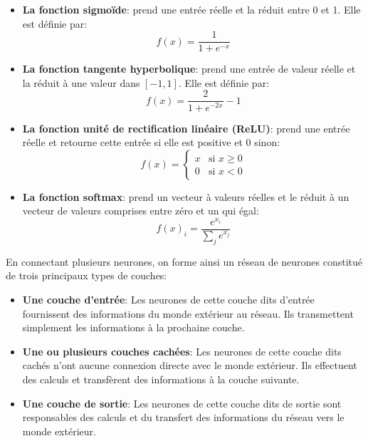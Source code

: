     \begin{itemize}
        \item \textbf{La fonction sigmoïde}: prend une entrée réelle et la réduit entre 0 et 1. Elle est définie par:
            \begin{equation}
                f(x) = \frac{1}{1 + e^{-x}}
            \end{equation}
        \item \textbf{La fonction tangente hyperbolique}: prend une entrée de valeur réelle et la réduit à une valeur dans $[-1, 1]$. Elle est définie par:
            \begin{equation}
                f(x) = \frac{2}{1 + e^{-2x}} - 1 
            \end{equation}
        \item \textbf{La fonction unité de rectification linéaire (ReLU)}: prend une entrée réelle et retourne cette entrée si elle est positive et 0 sinon:
            \begin{equation}
                f(x) = 
                \begin{cases} 
                    x       & \text{si } x \geq 0 \\
                    0       & \text{si } x < 0
                \end{cases}
            \end{equation}
        \item \textbf{La fonction softmax}: prend un vecteur à valeurs réelles et le réduit à un vecteur de valeurs comprises entre zéro et un qui égal:
            \begin{equation}
                f(x)_{i} = \frac{e^{x_i}}{\sum_{j}e^{x_j}}
            \end{equation}
    \end{itemize}
    En connectant plusieurs neurones, on forme ainsi un réseau de neurones constitué de trois principaux types de couches:
        \begin{itemize}
            \item \textbf{Une couche d'entrée}: Les neurones de cette couche dits d'entrée fournissent des informations du monde extérieur au réseau. Ils transmettent simplement les informations à la prochaine couche.
            \item \textbf{Une ou plusieurs couches cachées}: Les neurones de cette couche dits cachés n'ont aucune connexion directe avec le monde extérieur. Ils effectuent des calculs et transfèrent des informations à la couche suivante.
            \item \textbf{Une couche de sortie}: Les neurones de cette couche dits de sortie sont responsables des calculs et du transfert des informations du réseau vers le monde extérieur.
        \end{itemize}
